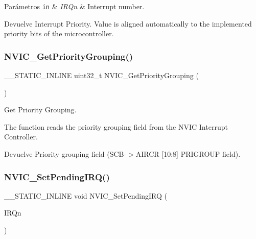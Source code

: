 \begin{DoxyParams}[1]{Parámetros}
\mbox{\tt in}  & {\em I\+R\+Qn} & Interrupt number. \\
\hline
\end{DoxyParams}
\begin{DoxyReturn}{Devuelve}
Interrupt Priority. Value is aligned automatically to the implemented priority bits of the microcontroller. 
\end{DoxyReturn}
\mbox{\label{group___c_m_s_i_s___core___n_v_i_c_functions_ga394f7ce2ca826c0da26284d17ac6524d}} 
\subsubsection{\texorpdfstring{N\+V\+I\+C\+\_\+\+Get\+Priority\+Grouping()}{NVIC\_GetPriorityGrouping()}}
{\footnotesize\ttfamily \+\_\+\+\_\+\+S\+T\+A\+T\+I\+C\+\_\+\+I\+N\+L\+I\+NE uint32\+\_\+t N\+V\+I\+C\+\_\+\+Get\+Priority\+Grouping (\begin{DoxyParamCaption}\item[{void}]{ }\end{DoxyParamCaption})}



Get Priority Grouping. 

The function reads the priority grouping field from the N\+V\+IC Interrupt Controller.

\begin{DoxyReturn}{Devuelve}
Priority grouping field (S\+C\+B-\/$>$A\+I\+R\+CR \mbox{[}10\+:8\mbox{]} P\+R\+I\+G\+R\+O\+UP field). 
\end{DoxyReturn}
\mbox{\label{group___c_m_s_i_s___core___n_v_i_c_functions_ga3ecf446519da33e1690deffbf5be505f}} 
\subsubsection{\texorpdfstring{N\+V\+I\+C\+\_\+\+Set\+Pending\+I\+R\+Q()}{NVIC\_SetPendingIRQ()}}
{\footnotesize\ttfamily \+\_\+\+\_\+\+S\+T\+A\+T\+I\+C\+\_\+\+I\+N\+L\+I\+NE void N\+V\+I\+C\+\_\+\+Set\+Pending\+I\+RQ (\begin{DoxyParamCaption}\item[{I\+R\+Qn\+\_\+\+Type}]{I\+R\+Qn }\end{DoxyParamCaption})}



